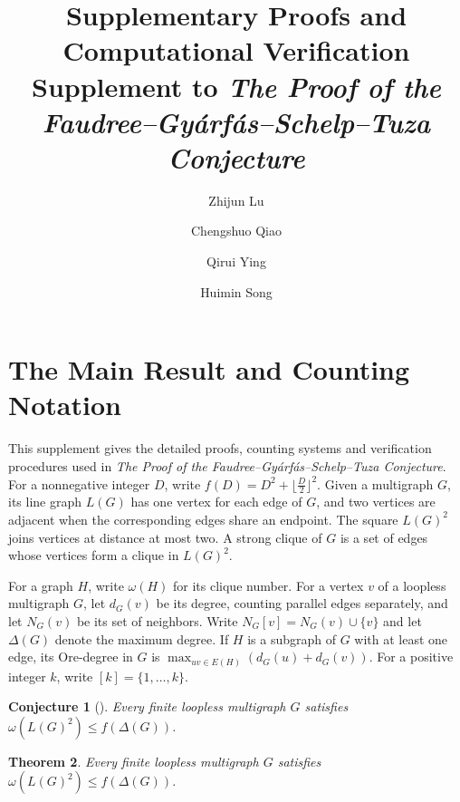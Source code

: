 \documentclass[preprint,11pt,numbers]{elsarticle-arxiv}
\numberwithin{equation}{section}
\newtheorem{theorem}{Theorem}[section]
\newtheorem{conjecture}[theorem]{Conjecture}
\theoremstyle{definition}
\newcommand{\papertitle}{The Proof of the Faudree--Gy\'arf\'as--Schelp--Tuza Conjecture}
\begin{document}

\begin{frontmatter}
\title{\textbf{\Large Supplementary Proofs and Computational Verification}\\[0.5em]
 \normalsize Supplement to \emph{\papertitle}}
\author[1]{Zhijun Lu}
\author[1]{Chengshuo Qiao}
\author[1]{Qirui Ying}
\author[1]{Huimin Song}
\end{frontmatter}

\renewcommand{\thesection}{S\arabic{section}}
\tableofcontents

\section{The Main Result and Counting Notation}\label{sec:overview}

This supplement gives the detailed proofs, counting systems and
verification procedures used in \emph{\papertitle}. For a nonnegative
integer $D$, write $f(D)=D^2+\lfloor\frac{D}{2}\rfloor^2$. Given a
multigraph $G$, its line graph $L(G)$ has one vertex for each edge of
$G$, and two vertices are adjacent when the corresponding edges
share an endpoint. The square $L(G)^2$ joins vertices at distance
at most two. A strong clique of $G$ is a set of edges whose
vertices form a clique in $L(G)^2$.

For a graph $H$, write $\omega(H)$ for its clique number. For a
vertex $v$ of a loopless multigraph $G$, let $d_G(v)$ be its degree,
counting parallel edges separately, and let $N_G(v)$ be its set
of neighbors. Write $N_G[v]=N_G(v)\cup\{v\}$ and let $\Delta(G)$
denote the maximum degree. If $H$ is a subgraph of $G$ with at
least one edge, its Ore-degree in $G$ is
$\max_{uv\in E(H)}(d_G(u)+d_G(v))$. For a positive integer $k$, write
$[k]=\{1,\ldots,k\}$.

\begin{conjecture}[\cite{FGST1990}]\label{conj:fgst}
Every finite loopless multigraph $G$ satisfies
$\omega(L(G)^2)\leq f(\Delta(G))$.
\end{conjecture}

\begin{theorem}\label{thm:multigraph}
Every finite loopless multigraph $G$ satisfies
$\omega(L(G)^2)\leq f(\Delta(G))$.
\end{theorem}
\end{document}
